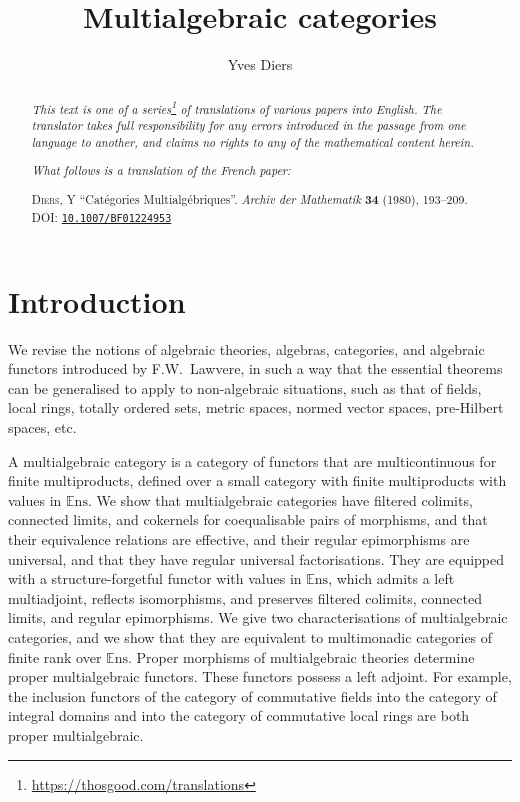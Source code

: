 \documentclass{article}
\title{Multialgebraic categories}
\author{Yves Diers}
\date{}
\newcommand{\doctype}{French paper}
\newcommand{\origcit}{%
  \textsc{Diers, Y}
  ``Cat\'{e}gories Multialg\'{e}briques''.
  \emph{Archiv der Mathematik} \textbf{34} (1980), 193--209.
  DOI: \href{https://doi.org/10.1007/BF01224953}{\texttt{10.1007/BF01224953}}%
}
\newcommand{\Set}{\mathbb{E}\mathrm{ns}}
\newcommand{\oldpage}[1]{\marginpar{\footnotesize$\Big\vert$ \textit{p.~#1}}}
\begin{document}
\maketitle
\thispagestyle{fancy}

\renewcommand{\abstractname}{Translator's note.}

\begin{abstract}
  \renewcommand*{\thefootnote}{\fnsymbol{footnote}}
  \emph{This text is one of a series\footnote{\url{https://thosgood.com/translations}} of translations of various papers into English.}
  \emph{The translator takes full responsibility for any errors introduced in the passage from one language to another, and claims no rights to any of the mathematical content herein.}

  \medskip
  
  \emph{What follows is a translation of the \doctype:}

  \medskip\noindent
  \origcit
\end{abstract}

\setcounter{footnote}{0}
\setcounter{section}{-1}

\setcounter{tocdepth}{1}
\tableofcontents
\bigskip



\section{Introduction}
\label{0}

\oldpage{193}
We revise the notions of algebraic theories, algebras, categories, and algebraic functors introduced by F.W.~Lawvere, in such a way that the essential theorems can be generalised to apply to non-algebraic situations, such as that of fields, local rings, totally ordered sets, metric spaces, normed vector spaces, pre-Hilbert spaces, etc.

A multialgebraic category is a category of functors that are multicontinuous for finite multiproducts, defined over a small category with finite multiproducts with values in $\Set$.
We show that multialgebraic categories have filtered colimits, connected limits, and cokernels for coequalisable pairs of morphisms, and that their equivalence relations are effective, and their regular epimorphisms are universal, and that they have regular universal factorisations.
They are equipped with a structure-forgetful functor with values in $\Set$, which admits a left multiadjoint, reflects isomorphisms, and preserves filtered colimits, connected limits, and regular epimorphisms.
We give two characterisations of multialgebraic categories, and we show that they are equivalent to multimonadic categories of finite rank over $\Set$.
Proper morphisms of multialgebraic theories determine proper multialgebraic functors.
These functors possess a left adjoint.
For example, the inclusion functors of the category of commutative fields into the category of integral domains and into the category of commutative local rings are both proper multialgebraic.
\end{document}
